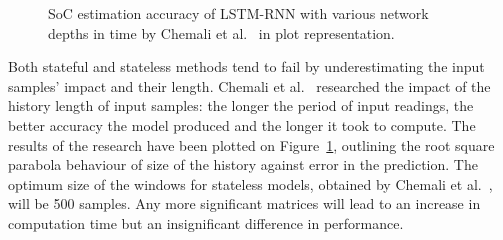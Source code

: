 %
%
\begin{figure}[htbp]
    \centering
    
    \caption{SoC estimation accuracy of LSTM-RNN with various network depths in time by Chemali et al.~\cite{Chemali2017} in plot representation.}
    \label{fig:chemali-accuracy}
\end{figure}
Both stateful and stateless methods tend to fail by underestimating the input samples' impact and their length.
Chemali et al.~\cite{Chemali2017} researched the impact of the history length of input samples: the longer the period of input readings, the better accuracy the model produced and the longer it took to compute.
The results of the research have been plotted on \mbox{Figure~\ref{fig:chemali-accuracy}}, outlining the root square parabola behaviour of size of the history against error in the prediction.
The optimum size of the windows for stateless models, obtained by Chemali et al.~\cite{Chemali2017}, will be 500 samples.
Any more significant matrices will lead to an increase in computation time but an insignificant difference in performance.

